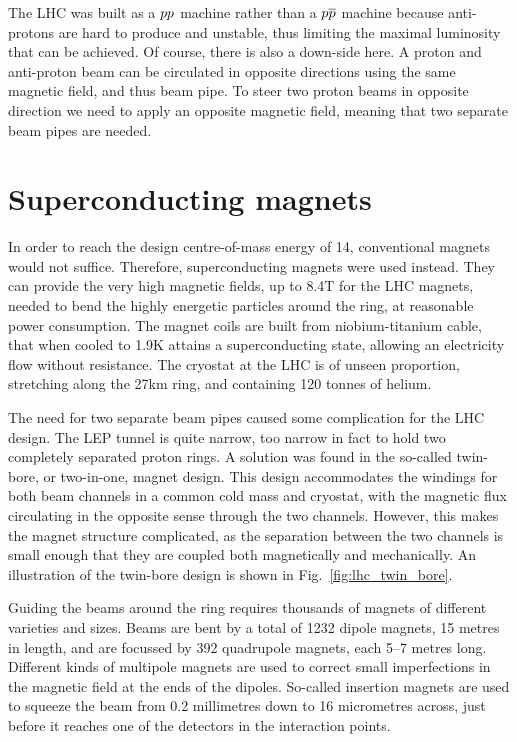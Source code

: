 The LHC was built as a ${p}{p}$ machine rather than a ${p}{\overline{p}}$ machine because anti-protons are
hard to produce and unstable, thus limiting the maximal luminosity that can be achieved. Of course,
there is also a down-side here. A proton and anti-proton beam can be circulated in opposite
directions using the same magnetic field, and thus beam pipe. To steer two proton beams in opposite
direction we need to apply an opposite magnetic field, meaning that two separate beam pipes are
needed. 


\section{Superconducting magnets}

In order to reach the design centre-of-mass energy of 14\TeV, conventional magnets would not
suffice. Therefore, superconducting magnets were used instead. They can provide the very high
magnetic fields, up to 8.4T for the LHC magnets, needed to bend the highly energetic particles
around the ring, at reasonable power consumption. The magnet coils are built from niobium-titanium
cable, that when cooled to 1.9K attains a superconducting state, allowing an electricity flow
without resistance. The cryostat at the LHC is of unseen proportion, stretching along the 27km ring,
and containing 120 tonnes of helium.

The need for two separate beam pipes caused some complication for the LHC design. The LEP tunnel is
quite narrow, too narrow in fact to hold two completely separated proton rings. A solution was
found in the so-called twin-bore, or two-in-one, magnet design. This design accommodates the
windings for both beam channels in a common cold mass and cryostat, with the magnetic flux
circulating in the opposite sense through the two channels. 
However, this makes the magnet structure complicated, as the separation between the two channels is
small enough that they are coupled both magnetically and mechanically. An illustration of the
twin-bore design is shown in Fig.~\ref{fig:lhc_twin_bore}. 

Guiding the beams around the ring requires thousands of magnets of different varieties and sizes.
Beams are bent by a total of 1232 dipole magnets, 15 metres in length, and are focussed by 392
quadrupole magnets, each 5–7 metres long. Different kinds of multipole magnets are used to correct
small imperfections in the magnetic field at the ends of the dipoles. So-called insertion magnets
are used to squeeze the beam from 0.2 millimetres down to 16 micrometres across, just before it
reaches one of the detectors in the interaction points. 

